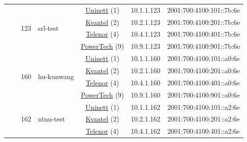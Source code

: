 \begin{small}
\begin{center}
\begin{longtable}{|c|c|c|c|c|c|c|c|}
  &  & \multirow{4}{*}{\tiny{123}} & \multicolumn{1}{|l|}{\multirow{4}{*}{\tiny{srl-test}}} & \multicolumn{2}{|c|}{\tiny{\href{https://www.uninett.no}{Uninett} (1)}} & \tiny{10.1.1.123} & \tiny{2001:700:4100:101::7b:6e} \\* \cline{5-5}\cline{6-6}\cline{7-7}\cline{8-8}
  &  &  &  & \multicolumn{2}{|c|}{\tiny{\href{http://kvantel.no}{Kvantel} (2)}} & \tiny{10.2.1.123} & \tiny{2001:700:4100:201::7b:6e} \\* \cline{5-5}\cline{6-6}\cline{7-7}\cline{8-8}
  &  &  &  & \multicolumn{2}{|c|}{\tiny{\href{https://www.telenor.no}{Telenor} (4)}} & \tiny{10.4.1.123} & \tiny{2001:700:4100:401::7b:6e} \\* \cline{5-5}\cline{6-6}\cline{7-7}\cline{8-8}
  &  &  &  & \multicolumn{2}{|c|}{\tiny{\href{http://www.powertech.no}{PowerTech} (9)}} & \tiny{10.9.1.123} & \tiny{2001:700:4100:901::7b:6e} \\* \cline{3-3}\cline{4-4}\cline{5-5}\cline{6-6}\cline{7-7}\cline{8-8}
  &  & \multirow{4}{*}{\tiny{160}} & \multicolumn{1}{|l|}{\multirow{4}{*}{\tiny{hu-kunwang}}} & \multicolumn{2}{|c|}{\tiny{\href{https://www.uninett.no}{Uninett} (1)}} & \tiny{10.1.1.160} & \tiny{2001:700:4100:101::a0:6e} \\* \cline{5-5}\cline{6-6}\cline{7-7}\cline{8-8}
  &  &  &  & \multicolumn{2}{|c|}{\tiny{\href{http://kvantel.no}{Kvantel} (2)}} & \tiny{10.2.1.160} & \tiny{2001:700:4100:201::a0:6e} \\* \cline{5-5}\cline{6-6}\cline{7-7}\cline{8-8}
  &  &  &  & \multicolumn{2}{|c|}{\tiny{\href{https://www.telenor.no}{Telenor} (4)}} & \tiny{10.4.1.160} & \tiny{2001:700:4100:401::a0:6e} \\* \cline{5-5}\cline{6-6}\cline{7-7}\cline{8-8}
  &  &  &  & \multicolumn{2}{|c|}{\tiny{\href{http://www.powertech.no}{PowerTech} (9)}} & \tiny{10.9.1.160} & \tiny{2001:700:4100:901::a0:6e} \\* \cline{3-3}\cline{4-4}\cline{5-5}\cline{6-6}\cline{7-7}\cline{8-8}
  &  & \multirow{4}{*}{\tiny{162}} & \multicolumn{1}{|l|}{\multirow{4}{*}{\tiny{ntnu-test}}} & \multicolumn{2}{|c|}{\tiny{\href{https://www.uninett.no}{Uninett} (1)}} & \tiny{10.1.1.162} & \tiny{2001:700:4100:101::a2:6e} \\* \cline{5-5}\cline{6-6}\cline{7-7}\cline{8-8}
  &  &  &  & \multicolumn{2}{|c|}{\tiny{\href{http://kvantel.no}{Kvantel} (2)}} & \tiny{10.2.1.162} & \tiny{2001:700:4100:201::a2:6e} \\* \cline{5-5}\cline{6-6}\cline{7-7}\cline{8-8}
  &  &  &  & \multicolumn{2}{|c|}{\tiny{\href{https://www.telenor.no}{Telenor} (4)}} & \tiny{10.4.1.162} & \tiny{2001:700:4100:401::a2:6e} \\* \cline{5-5}\cline{6-6}\cline{7-7}\cline{8-8}

\end{longtable}
\end{center}
\end{small}
